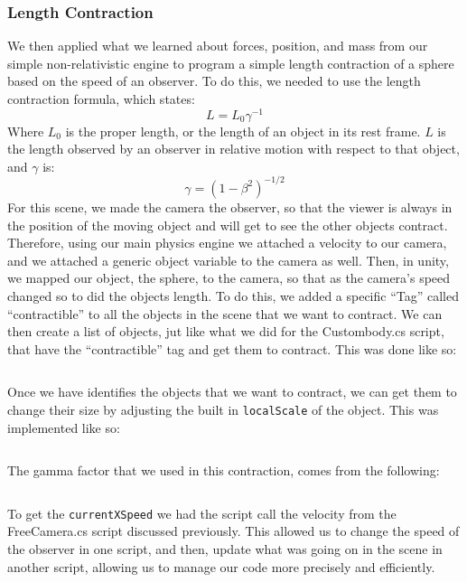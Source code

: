 \documentclass[12pt]{article}
\begin{document}
\subsubsection{Length Contraction}
We then applied what we learned about forces, position, and mass from our simple non-relativistic engine to program a simple length contraction of a sphere based on the speed of an observer. To do this, we needed to use the length contraction formula, which states:
\begin{equation}
L = L_0\gamma^{-1}
\end{equation}
Where $L_0$ is the proper length, or the length of an object in its rest frame. $L$ is the length observed by an observer in relative motion with respect to that object, and $\gamma$ is:
\begin{equation}
\gamma = (1-\beta^2)^{-1/2}
\end{equation}
For this scene, we made the camera the observer, so that the viewer is always in the position of the moving object and will get to see the other objects contract. Therefore, using our main physics engine we attached a velocity to our camera, and we attached a generic object variable to the camera as well. Then, in unity, we mapped our object, the sphere, to the camera, so that as the camera's speed changed so to did the objects length. To do this, we added a specific \enquote{Tag} called \enquote{contractible} to all the objects in the scene that we want to contract. We can then create a list of objects, jut like what we did for the Custombody.cs script, that have the \enquote{contractible} tag and get them to contract. This was done like so:
\inputminted[firstline=38,lastline=48,linenos,fontsize=\footnotesize,bgcolor=codebg]{csharp}{../unity/Assets/Scripts/ReferenceFrameEngine.cs}
Once we have identifies the objects that we want to contract, we can get them to change their size by adjusting the built in \texttt{localScale} of the object. This was implemented like so:
\inputminted[firstline=123,lastline=132,linenos,fontsize=\footnotesize,bgcolor=codebg]{csharp}{../unity/Assets/Scripts/ReferenceFrameEngine.cs}
The gamma factor that we used in this contraction, comes from the following:
\inputminted[firstline=119,lastline=119,linenos,fontsize=\footnotesize,bgcolor=codebg]{csharp}{../unity/Assets/Scripts/ReferenceFrameEngine.cs}
To get the \texttt{currentXSpeed} we had the script call the velocity from the FreeCamera.cs script discussed previously. This allowed us to change the speed of the observer in one script, and then, update what was going on in the scene in another script, allowing us to manage our code more precisely and efficiently. 
\end{document}
